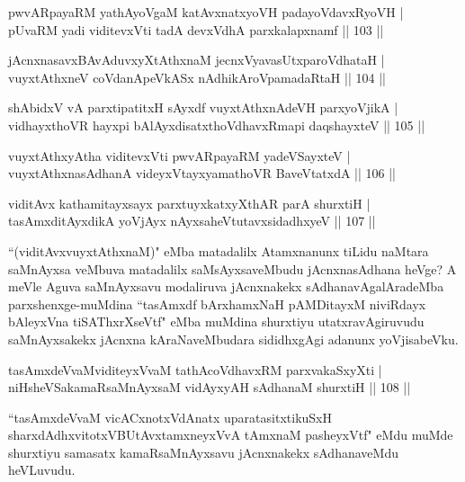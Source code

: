 \begin{shl}
pwvARpayaRM yathAyoVgaM katAvxnatxyoVH padayoVdavxRyoVH |\\
pUvaRM yadi viditevxVti tadA devxVdhA parxkalapxnamf \hfill || 103 ||
\end{shl}

\begin{shl}
jAcnxnasavxBAvAduvxyXtAthxnaM jecnxVyavasUtxparoVdhataH |\\
vuyxtAthxneV coVdanApeVkASx nAdhikAroVpamadaRtaH \hfill || 104 ||
\end{shl}

\begin{shl}
shAbidxV vA parxtipatitxH sAyxdf vuyxtAthxnAdeVH parxyoVjikA |\\
vidhayxthoVR hayxpi bAlAyxdisatxthoVdhavxRmapi daqshayxteV \hfill || 105 ||
\end{shl}

\begin{shl}
vuyxtAthxyAtha viditevxVti pwvARpayaRM yadeVSayxteV |\\
vuyxtAthxnasAdhanA videyxVtayxyamathoVR BaveVtatxdA \hfill || 106 ||
\end{shl}

\begin{shl}
viditAvx kathamitayxsayx parxtuyxkatxyXthAR parA shurxtiH |\\
tasAmxditAyxdikA yoVjAyx nAyxsaheVtutavxsidadhxyeV \hfill || 107 ||
\end{shl}

\begin{artha}
``(viditAvxvuyxtAthxnaM)" eMba matadalilx Atamxnanunx tiLidu naMtara saMnAyxsa veMbuva matadalilx saMsAyxsaveMbudu jAcnxnasAdhana heVge? A meVle Aguva saMnAyxsavu modaliruva jAcnxnakekx sAdhanavAgalAradeMba parxshenxge-muMdina ``tasAmxdf bArxhamxNaH pAMDitayxM niviRdayx bAleyxVna tiSAThxrXseVtf" eMba muMdina shurxtiyu utatxravAgiruvudu saMnAyxsakekx jAcnxna kAraNaveMbudara sididhxgAgi adanunx yoVjisabeVku.
\end{artha}

\begin{shl}
tasAmxdeVvaMviditeyxVvaM tathAcoVdhavxRM parxvakaSxyXti |\\
niHsheVSakamaRsaMnAyxsaM vidAyxyAH sAdhanaM shurxtiH \hfill || 108 ||
\end{shl}

\begin{artha}
``tasAmxdeVvaM vicACxnotxVdAnatx uparatasitxtikuSxH sharxdAdhxvitotxV\break BUtAvx\s tamxneyxVvA  tAmxnaM pasheyxVtf" eMdu muMde shurxtiyu samasatx kamaRsaMnAyxsavu jAcnxnakekx sAdhanaveMdu heVLuvudu. 
\end{artha}

